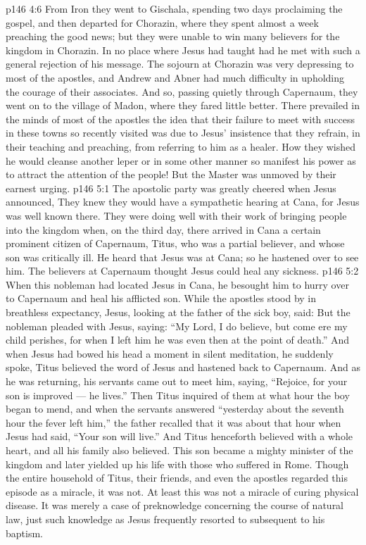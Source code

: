 \vs p146 4:6 \pc From Iron they went to Gischala, spending two days proclaiming the gospel, and then departed for Chorazin, where they spent almost a week preaching the good news; but they were unable to win many believers for the kingdom in Chorazin. In no place where Jesus had taught had he met with such a general rejection of his message. The sojourn at Chorazin was very depressing to most of the apostles, and Andrew and Abner had much difficulty in upholding the courage of their associates. And so, passing quietly through Capernaum, they went on to the village of Madon, where they fared little better. There prevailed in the minds of most of the apostles the idea that their failure to meet with success in these towns so recently visited was due to Jesus’ insistence that they refrain, in their teaching and preaching, from referring to him as a healer. How they wished he would cleanse another leper or in some other manner so manifest his power as to attract the attention of the people! But the Master was unmoved by their earnest urging.
\vs p146 5:1 The apostolic party was greatly cheered when Jesus announced,  They knew they would have a sympathetic hearing at Cana, for Jesus was well known there. They were doing well with their work of bringing people into the kingdom when, on the third day, there arrived in Cana a certain prominent citizen of Capernaum, Titus, who was a partial believer, and whose son was critically ill. He heard that Jesus was at Cana; so he hastened over to see him. The believers at Capernaum thought Jesus could heal any sickness.
\vs p146 5:2 When this nobleman had located Jesus in Cana, he besought him to hurry over to Capernaum and heal his afflicted son. While the apostles stood by in breathless expectancy, Jesus, looking at the father of the sick boy, said:  But the nobleman pleaded with Jesus, saying: “My Lord, I do believe, but come ere my child perishes, for when I left him he was even then at the point of death.” And when Jesus had bowed his head a moment in silent meditation, he suddenly spoke,  Titus believed the word of Jesus and hastened back to Capernaum. And as he was returning, his servants came out to meet him, saying, “Rejoice, for your son is improved --- he lives.” Then Titus inquired of them at what hour the boy began to mend, and when the servants answered “yesterday about the seventh hour the fever left him,” the father recalled that it was about that hour when Jesus had said, “Your son will live.” And Titus henceforth believed with a whole heart, and all his family also believed. This son became a mighty minister of the kingdom and later yielded up his life with those who suffered in Rome. Though the entire household of Titus, their friends, and even the apostles regarded this episode as a miracle, it was not. At least this was not a miracle of curing physical disease. It was merely a case of preknowledge concerning the course of natural law, just such knowledge as Jesus frequently resorted to subsequent to his baptism.
